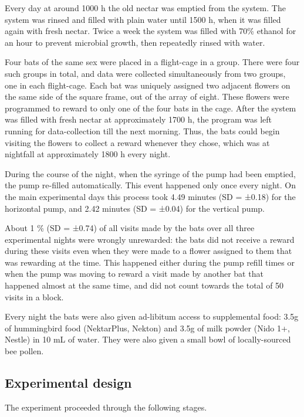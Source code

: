 \documentclass[
]{article}
\begin{document}
Every day at around 1000 h the old nectar was emptied from the system. The system was rinsed and filled with plain water until 1500 h, when it was filled again with fresh nectar. Twice a week the system was filled with 70\% ethanol for an hour to prevent microbial growth, then repeatedly rinsed with water.

Four bats of the same sex were placed in a flight-cage in a group. There were four such groups in total, and data were collected simultaneously from two groups, one in each flight-cage. Each bat was uniquely assigned two adjacent flowers on the same side of the square frame, out of the array of eight. These flowers were programmed to reward to only one of the four bats in the cage. After the system was filled with fresh nectar at approximately 1700 h, the program was left running for data-collection till the next morning. Thus, the bats could begin visiting the flowers to collect a reward whenever they chose, which was at nightfall at approximately 1800 h every night.

During the course of the night, when the syringe of the pump had been emptied, the pump re-filled automatically. This event happened only once every night. On the main experimental days this process took 4.49 minutes (SD = ±0.18) for the horizontal pump, and 2.42 minutes (SD = ±0.04) for the vertical pump.

About 1 \% (SD = ±0.74) of all visits made by the bats over all three experimental nights were wrongly unrewarded: the bats did not receive a reward during these visits even when they were made to a flower assigned to them that was rewarding at the time. This happened either during the pump refill times or when the pump was moving to reward a visit made by another bat that happened almost at the same time, and did not count towards the total of 50 visits in a block.

Every night the bats were also given ad-libitum access to supplemental food: 3.5g of hummingbird food (NektarPlus, Nekton) and 3.5g of milk powder (Nido 1+, Nestle) in 10 mL of water. They were also given a small bowl of locally-sourced bee pollen.

\hypertarget{experimental-design}{%
\subsection{Experimental design}\label{experimental-design}}

The experiment proceeded through the following stages.
\end{document}
